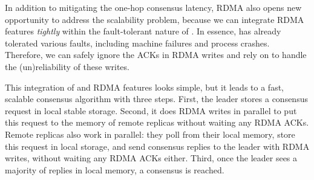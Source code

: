 

% 
In addition to mitigating the one-hop consensus latency, RDMA also opens 
new opportunity to address the \paxos scalability problem, because we
can integrate RDMA features \emph{tightly} within the fault-tolerant nature of 
\paxos. In essence, \paxos has already tolerated various faults, including 
machine failures and process crashes. Therefore, we can safely ignore the ACKs 
in RDMA writes and rely on \paxos to handle the (un)reliability of these writes.

This integration of \paxos and RDMA features looks simple, but it leads to 
a fast, scalable \paxos consensus algorithm with three steps. First, the leader 
stores a consensus request in local stable storage. Second, it does RDMA writes 
in parallel to put this request to the memory of remote replicas without 
waiting any RDMA ACKs. Remote replicas also work in parallel: they poll from 
their local memory, store this request in local storage, and send consensus 
replies to the leader with RDMA writes, without waiting any RDMA ACKs 
either. Third, once the leader sees a majority of replies in local memory, 
a consensus is reached.

